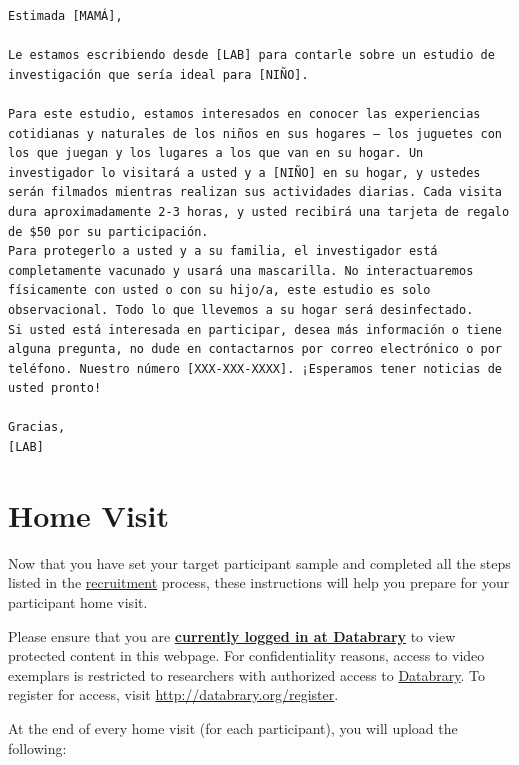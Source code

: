 \documentclass[
  12pt,
]{book}
\begin{document}
\begin{verbatim}
Estimada [MAMÁ],

Le estamos escribiendo desde [LAB] para contarle sobre un estudio de investigación que sería ideal para [NIÑO].

Para este estudio, estamos interesados en conocer las experiencias cotidianas y naturales de los niños en sus hogares – los juguetes con los que juegan y los lugares a los que van en su hogar. Un investigador lo visitará a usted y a [NIÑO] en su hogar, y ustedes serán filmados mientras realizan sus actividades diarias. Cada visita dura aproximadamente 2-3 horas, y usted recibirá una tarjeta de regalo de $50 por su participación.
Para protegerlo a usted y a su familia, el investigador está completamente vacunado y usará una mascarilla. No interactuaremos físicamente con usted o con su hijo/a, este estudio es solo observacional. Todo lo que llevemos a su hogar será desinfectado.
Si usted está interesada en participar, desea más información o tiene alguna pregunta, no dude en contactarnos por correo electrónico o por teléfono. Nuestro número [XXX-XXX-XXXX]. ¡Esperamos tener noticias de usted pronto!

Gracias,
[LAB]
\end{verbatim}

\hypertarget{home-visit}{%
\chapter{Home Visit}\label{home-visit}}

Now that you have set your target participant sample and completed all the steps listed in the \href{collection_recruitment.html}{recruitment} process, these instructions will help you prepare for your participant home visit.

Please ensure that you are \href{https://nyu.databrary.org/user/login}{\textbf{currently logged in at Databrary}} to view protected content in this webpage. For confidentiality reasons, access to video exemplars is restricted to researchers with authorized access to \href{http://databrary.org}{Databrary}. To register for access, visit \url{http://databrary.org/register}.

At the end of every home visit (for each participant), you will upload the following:
\end{document}
